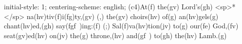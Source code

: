 initial-style: 1;
centering-scheme: english;
(c4)At(f) the(gv) Lord's(gh) <sp>*</sp> na(hv)tiv(f)i(fg)ty,(gv) (,) the(gv) choirs(hv) of(g) an(hv)gels(g) chant(hv)ed,(gh) say(fgf~)ing:(f) (;) Sal(f)va(hv)tion(jv) to(g) our(fe) God,(fv) seat(gv)ed(hv) on(jv) the(g) throne,(hv) and(gf~) to(gh) the(hv) Lamb.(g)
